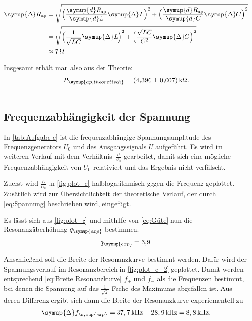 \begin{align*}
  \label{eqn:Fehler Rap}
  \symup{\Delta} R_{\text{ap}} &= \sqrt{\Bigl(\frac{\symup{d}R_{\text{ap}}}{\symup{d}L}\symup{\Delta} L \Bigr)^2+\Bigl(\frac{\symup{d}R_{\text{ap}}}{\symup{d}C}\symup{\Delta} C\Bigr)^2} \\
  &= \sqrt{\Bigl(\frac{1}{\sqrt{LC}}\symup{\Delta} L\Bigr)^2+\Bigl(\frac{\sqrt{LC}}{C^2}\symup{\Delta} C\Bigr)^2} \\
  &\approx 7\,\unit{\ohm}
\end{align*}

Insgesamt erhält man also aus der Theorie:
\begin{gather*}
  R_{\symup{ap, theoretisch}} = \qty{4,396+-0.007}{\kilo\ohm}. \\ \notag
\end{gather*}

\subsection{Frequenzabhängigkeit der Spannung}
\label{sec:Frequenzabhängigkeit der Spannung}

In \autoref{tab:Aufgabe c} ist die frequenzabhängige Spannungsamplitude des Frequenzgenerators $U_0$ und des Ausgangssignals $U$
aufgeführt. Es wird im weiteren Verlauf mit dem Verhältnis~$\frac{U}{U_{0}}$ gearbeitet, damit sich eine mögliche
Frequenzabhängigkeit von $U_0$ relativiert und das Ergebnis nicht verfälscht. 

Zuerst wird $\frac{U}{U_{0}}$ in \autoref{fig:plot_c} halblogarithmisch gegen die Frequenz geplottet.
Zusätlich wird zur Übersichtlichkeit der theoretische Verlauf, der durch \eqref{eq:Spannung} beschrieben wird, eingefügt.

Es lässt sich aus \autoref{fig:plot_c} und mithilfe von \eqref{eq:Güte} nun die Resonanzüberhöhung $q_{\symup{exp}}$ bestimmen.
\begin{gather*}
  q_{\symup{exp}} = \num{3,9}. \notag
\end{gather*}

Anschließend soll die Breite der Resonanzkurve bestimmt werden.
Dafür wird der Spannungsverlauf im Resonanzbereich in \autoref{fig:plot_c_2} geplottet.
Damit werden entsprechend \eqref{eq:Breite Resonanzkurve} $f_+$ und $f_-$ als die Frequenzen bestimmt, bei denen
die Spannung auf das  $\frac{1}{\sqrt{2}}$-Fache des Maximums abgefallen ist.
Aus deren Differenz ergibt sich dann die Breite der Resonanzkurve experiementell zu
\begin{gather*}
  \symup{\Delta}f_{\symup{exp}} = 37,7\,\unit{\kilo\hertz} - 28,9\,\unit{\kilo\hertz} = 8,8\,\unit{\kilo\hertz}. \notag
\end{gather*}

